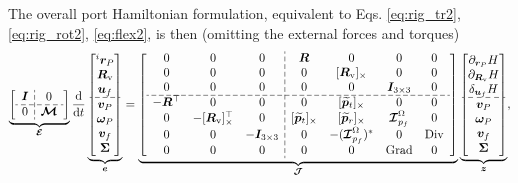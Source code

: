 \documentclass{svjour3}                     %
\DeclareMathOperator*{\Grad}{Grad}
\DeclareMathOperator*{\Div}{Div}
\newcommand{\crmat}[1]{\ensuremath{[#1]_{\times}}}
\begin{document}
The overall port Hamiltonian formulation, equivalent to Eqs. \eqref{eq:rig_tr2}, \eqref{eq:rig_rot2}, \eqref{eq:flex2}, is then (omitting the external forces and torques)
\begin{equation}
\label{eq:ph_mfd_all}
\setlength{\dashlinegap}{2pt}
\underbrace{
	{\left[ \begin{array}{c:c}
		\bm{I} & 0 \\
		\hdashline
		0 & \bm{\mathcal{M}} \\
		\end{array} \right]}
}_{\bm{\mathcal{E}}}
\diff{}{t}
\underbrace{\begin{bmatrix}
	^i \bm{r}_P \\ \bm{R}_{\text{v}} \\ \bm{u}_f \\\hdashline  \bm{v}_P \\ \bm\omega_P  \\ \bm{v}_f  \\ \bm\Sigma \\
	\end{bmatrix}}_{\bm{e}} = 
\underbrace{
	{\left[ \begin{array}{ccc:cccc}
		0 & 0 & 0 &  \bm{R} & 0 & 0 & 0 \\
		0 & 0 & 0 & 0 & \crmat{\bm{R}_{\text{v}}} & 0 & 0 \\
		0 & 0 & 0 & 0 & 0 & \bm{I}_{3\times 3} & 0  \\ 
		\hdashline
		-\bm{R}^\top & 0 & 0 & 0 & \crmat{\widetilde{\bm{p}}_t} & 0 & 0 \\
		0 & -\crmat{\bm{R}_{\text{v}}}^\top & 0 & \crmat{\widetilde{\bm{p}}_t} & \crmat{\widetilde{\bm{p}}_r} & \bm{\mathcal{I}}_{p_f}^\Omega & 0 \\
		0 & 0 & -\bm{I}_{3\times 3} & 0 & -(\bm{\mathcal{I}}_{p_f}^\Omega)^* & 0 & \Div \\
		0 & 0 & 0 & 0 & 0 & \Grad & 0 \\
		\end{array} \right]}
}_{\bm{\mathcal{J}}}
\underbrace{\begin{bmatrix}
	\partial_{\bm{r}_P}H \\ \partial_{\bm{R}_\text{v}}H \\ \delta_{\bm{u}_f} H \\\hdashline  \bm{v}_P \\ \bm\omega_P  \\ \bm{v}_f  \\ \bm\Sigma \\
	\end{bmatrix}}_{\bm{z}},
\end{equation} 
\end{document}
